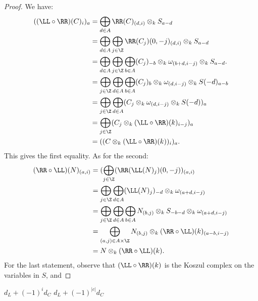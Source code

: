 \documentclass[12pt]{amsart}
\newtheorem{lemma}{Lemma}[section]
\theoremstyle{definition}
\theoremstyle{remark}
\def\DM{\operatorname{DM}}
\def\o{\omega}
\begin{document}
\begin{proof}
We have:
\begin{align*}
((\LL \circ \RR)(C)_i)_a &= \bigoplus_{d \in A} \RR(C)_{(d, i)} \otimes_k S_{a - d} \\
&= \bigoplus_{d \in A} \bigoplus_{j \in \Z} \RR(C_j)(0, -j)_{(d, i)} \otimes_k S_{a - d} \\
&= \bigoplus_{d \in A} \bigoplus_{j \in \Z} \bigoplus_{b \in A} (C_j)_{-b} \otimes_k \o_{(b + d, i - j)} \otimes_k S_{a - d}. \\
&= \bigoplus_{j \in \Z} \bigoplus_{d \in A} \bigoplus_{b \in A} (C_j)_b \otimes_k   \o_{(d, i - j)} \otimes_k S(-d)_{a - b} \\
&= \bigoplus_{j \in \Z} \bigoplus_{d \in A} (C_j \otimes_k   \o_{(d, i - j)} \otimes_k S(-d))_a \\
&= \bigoplus_{j \in \Z} (C_j \otimes_k  (\LL \circ \RR)(k)_{i - j} )_a \\
&= ((C \otimes_k  (\LL \circ \RR)(k))_i)_a.
\end{align*}
This gives the first equality. As for the second:
\begin{align*}
(\RR \circ \LL)(N)_{(a, i)} &= (\bigoplus_{j \in \Z} (\RR(\LL(N)_j)(0, -j))_{(a, i)} \\
&= \bigoplus_{j \in \Z}  \bigoplus_{d \in A} (\LL(N)_j)_{-d} \otimes_k \o_{(a + d, i-j)} \\
&= \bigoplus_{j \in \Z}  \bigoplus_{d \in A} \bigoplus_{b \in A} N_{(b,j)} \otimes_k S_{-b-d} \otimes_k \o_{(a + d, i-j)} \\
&= \bigoplus_{(a,j) \in A \times \Z} N_{(b,j)} \otimes_k (\RR \circ \LL)(k)_{(a-b,i-j)} \\
&= N \otimes_k (\RR \circ \LL)(k).
\end{align*}
For the last statement, observe that $(\LL \circ \RR)(k)$ is the Koszul complex on the variables in $S$, and 
\end{proof}

$d_L + (-1)^i d_C$
$d_L + (-1)^{|c|} d_C$
\iffalse
\begin{lemma}
\label{colimit}
Let $A$ be an $A$ abelian group, let $R$ be an $A$-graded ring, and let $a \in A$. Every differential module $(D, \del) \in \DM(R, a)$ is a direct limit of differential submodules whose underlying modules are finitely generated.
\end{lemma}

\begin{proof}
Let $\{D_i \}_{i \in I}$ be the set of all submodules of $D$. Since $D$ is the direct limit of the $D_i$, $(D, \del)$ is the direct limit of the differential modules $(D_i + \del(D_i)(-a), \del)$. 
\end{proof}
\fi
\end{document}
